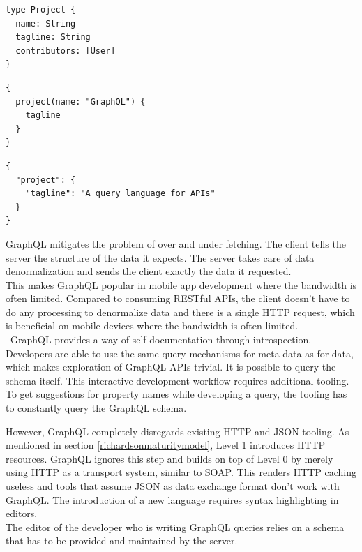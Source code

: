\lstset{language=GraphQL}
\begin{lstlisting}[caption=Simple data model in the GraphQL data description language., label=lst:graphqlmodel]
type Project {
  name: String
  tagline: String
  contributors: [User]
}
\end{lstlisting}
\lstset{language=GraphQL}
\begin{lstlisting}[caption=Example of a GraphQL query to fetch the tagline of a certain project., label=lst:graphqlquery]
{
  project(name: "GraphQL") {
    tagline
  }
}
\end{lstlisting}
\lstset{language=JSON}
\begin{lstlisting}[caption=Response of the GraphQL server in JSON., label=lst:graphqlresponse]
{
  "project": {
    "tagline": "A query language for APIs"
  }
}\end{lstlisting}

GraphQL mitigates the problem of over and under fetching. The client tells the server the structure of the data it expects. The server takes care of data denormalization and sends the client exactly the data it requested. \\
This makes GraphQL popular in mobile app development where the bandwidth is often limited. Compared to consuming RESTful APIs, the client doesn't have to do any processing to denormalize data and there is a single HTTP request, which is beneficial on mobile devices where the bandwidth is often limited. \\\
GraphQL provides a way of self-documentation through introspection. Developers are able to use the same query mechanisms for meta data as for data, which makes exploration of GraphQL APIs trivial. It is possible to query the schema itself. This interactive development workflow requires additional tooling. To get suggestions for property names while developing a query, the tooling has to constantly query the GraphQL schema.

However, GraphQL completely disregards existing HTTP and JSON tooling. As mentioned in section \ref{richardsonmaturitymodel}, Level 1 introduces HTTP resources. GraphQL ignores this step and builds on top of Level 0 by merely using HTTP as a transport system, similar to SOAP. This renders HTTP caching useless and tools that assume JSON as data exchange format don't work with GraphQL. The introduction of a new language requires syntax highlighting in editors. \\
The editor of the developer who is writing GraphQL queries relies on a schema that has to be provided and maintained by the server.

